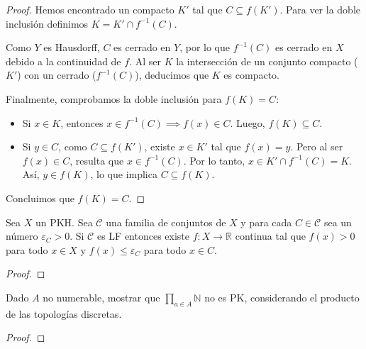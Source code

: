\documentclass{article}
\theoremstyle{plain}
\theoremstyle{definition}
\newenvironment{ejercicio}[1]{\begin{trivlist}
\item[\hskip \labelsep {\bfseries Ejercicio}\hskip \labelsep {\bfseries #1.}]}{\end{trivlist}}
\begin{document}
\begin{proof}
    Hemos encontrado un compacto \( K' \) tal que \( C \subseteq f(K') \). Para ver la doble inclusión definimos \( K = K' \cap f^{-1}(C) \).

    Como \( Y \) es Hausdorff, \( C \) es cerrado en \( Y \), por lo que \( f^{-1}(C) \) es cerrado en \( X \) debido a la continuidad de \( f \). Al ser \( K \) la intersección de un conjunto compacto (\( K' \)) con un cerrado (\( f^{-1}(C) \)), deducimos que \( K \) es compacto.

    Finalmente, comprobamos la doble inclusión para \( f(K) = C \):
    \begin{itemize}
        \item Si \( x \in K \), entonces \( x \in f^{-1}(C) \implies f(x) \in C \). Luego, \( f(K) \subseteq C \).
        \item Si \( y \in C \), como \( C \subseteq f(K') \), existe \( x \in K' \) tal que \( f(x) = y \). Pero al ser \( f(x) \in C \), resulta que \( x \in f^{-1}(C) \). Por lo tanto, \( x \in K' \cap f^{-1}(C) = K \). Así, \( y \in f(K) \), lo que implica \( C \subseteq f(K) \).
    \end{itemize}
    Concluimos que \( f(K) = C \).
\end{proof}

\begin{ejercicio}{7}
    Sea \( X \) un PKH. Sea \( \mathcal{C} \) una familia de conjuntos de \( X \) y para cada \( C \in \mathcal{C} \) sea un número \( \varepsilon_{C} > 0 \). Si \( \mathcal{C} \) es LF entonces existe \( f:X \rightarrow \mathbb{R} \) continua tal que \( f(x) > 0 \) para todo \( x \in X \) y \( f(x) \le \varepsilon_{C} \) para todo \( x \in C \).
\end{ejercicio}
\begin{proof}

\end{proof}

\begin{ejercicio}{8}
    Dado \( A \) no numerable, mostrar que \( \prod_{a \in A} \mathbb{N} \) no es PK, considerando el producto de las topologías discretas.
\end{ejercicio}
\begin{proof}

\end{proof}
\end{document}
